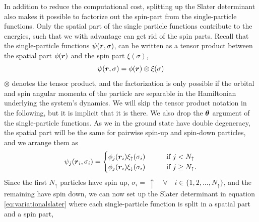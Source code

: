 In addition to reduce the computational cost, splitting up the Slater determinant also makes it possible to factorize out the spin-part from the single-particle functions. Only the spatial part of the single particle functions contribute to the energies, such that we with advantage can get rid of the spin parts. Recall that the single-particle functions $\psi(\boldsymbol{{r}},\sigma)$, can be written as a tensor product between the spatial part $\phi(\boldsymbol{{r}})$ and the spin part $\xi(\sigma)$, 
\begin{equation}
\psi(\boldsymbol{{r}},\sigma)=\phi(\boldsymbol{{r}})\otimes\xi(\sigma) 
\end{equation}
\fi
$\otimes$ denotes the tensor product, and the factorization is only possible if the orbital and spin angular momenta of the particle are separable in the Hamiltonian underlying the system's dynamics. We will skip the tensor product notation in the following, but it is implicit that it is there. We also drop the $\boldsymbol{{\theta}}$ argument of the single-particle functions. As we in the ground state have double degeneracy, the spatial part will be the same for pairwise spin-up and spin-down particles, and we arrange them as
\begin{equation}
\psi_j(\boldsymbol{{r}}_i,\sigma_i)=
\begin{cases}
\phi_j(\boldsymbol{{r}}_i)\xi_{\uparrow}(\sigma_i)\quad\quad&\text{if } j<N_{\uparrow}\\
\phi_j(\boldsymbol{{r}}_i)\xi_{\downarrow}(\sigma_i)\quad\quad&\text{if } j\geq N_{\uparrow}.
\end{cases}
\end{equation}
Since the first $N_{\uparrow}$ particles have spin up, $\sigma_i=\,\uparrow\quad\forall\quad i\in\{1,2,...,N_{\uparrow}\}$, and the remaining have spin down, we can now set up the Slater determinant in equation \eqref{eq:variationalslater} where each single-particle function is split in a spatial part and a spin part,
